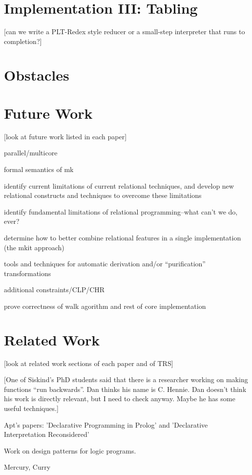 \chapter{Implementation III:  Tabling}

[can we write a PLT-Redex style reducer or a small-step interpreter
that runs to completion?]

\chapter{Obstacles}

\chapter{Future Work}
[look at future work listed in each paper]

parallel/multicore

formal semantics of mk

identify current limitations of current relational techniques, and
develop new relational constructs and techniques to overcome these
limitations

identify fundamental limitations of relational programming--what can't
we do, ever?

determine how to better combine relational features in a single
implementation (the mkit approach)

tools and techniques for automatic derivation and/or ``purification''
transformations

additional constraints/CLP/CHR

prove correctness of walk agorithm and rest of core implementation

\chapter{Related Work}
[look at related work sections of each paper and of TRS]

[One of Siskind's PhD students said that there is a researcher working
on making functions ``run backwards''.  Dan thinks his name is
C. Hennie.  Dan doesn't think his work is directly relevant, but I
need to check anyway.  Maybe he has some useful techniques.]

Apt's papers: 'Declarative Programming in Prolog' and 'Declarative
Interpretation Reconsidered'

Work on design patterns for logic programs.

Mercury, Curry

